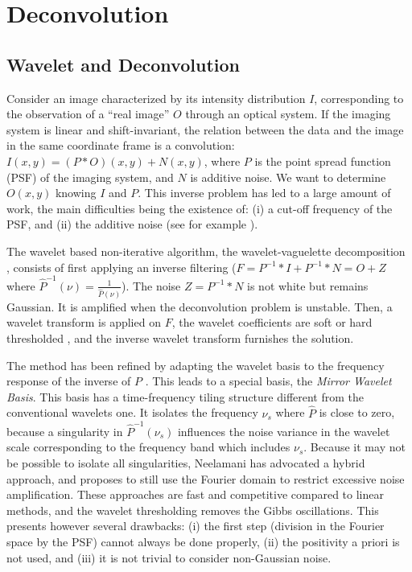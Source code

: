 \chapter{Deconvolution}
\section{Wavelet and Deconvolution}
\label{wdec}
Consider an image characterized by its intensity
distribution $I$, corresponding to the observation of a
``real image'' $O$ through an optical system. If the
imaging system is linear and shift-invariant, the relation between
the data and the image in the same coordinate frame is a
convolution:
$I(x,y) = (P * O)(x,y) + N(x,y)$,
where
$P$ is the point spread function (PSF) of the imaging system, and $N$
is additive noise. We want to determine $O(x,y)$ knowing $I$ and $P$. This
inverse problem has led to a large amount of work, the main difficulties 
being the existence of: (i) a cut-off frequency of the 
PSF, 
and (ii) the additive noise (see for example \cite{ima:bertero98}).

The wavelet based non-iterative algorithm, 
the wavelet-vaguelette decomposition \cite{rest:donoho95b},
consists of first applying an inverse filtering
($F = P^{-1} * I  +  P^{-1} * N = O + Z$
where $\hat{P}^{-1}(\nu) = \frac{1}{\hat{P}(\nu)}$). 
The noise $Z =  P^{-1} * N$ is not white but remains 
Gaussian. It is amplified when the deconvolution
problem is unstable. 
Then, a wavelet transform is applied on $F$, the wavelet coefficients
are soft or hard thresholded \cite{rest:donoho93_2}, 
and the inverse wavelet transform 
furnishes the solution. 

The method has been refined by 
adapting the wavelet basis to the frequency response of the inverse of $P$
\cite{rest:kalifa99}. This leads to a special basis,
the {\em Mirror Wavelet Basis}.  This basis has a 
time-frequency tiling structure different from the conventional wavelets one.
It isolates the frequency $\nu_s$ where $\hat{P}$ is close to zero, because 
a singularity in $\hat{P}^{-1}(\nu_s)$ influences the noise variance in
the wavelet scale corresponding to the frequency band which includes $\nu_s$.
Because it may not be possible to isolate all singularities, Neelamani
\cite{rest:neelamani99} has advocated a hybrid approach,
and proposes to still use the Fourier domain to restrict excessive noise
amplification. These approaches are fast and competitive compared to linear methods, and
the wavelet thresholding removes the Gibbs oscillations. 
This  presents however several drawbacks:
(i) the first step (division in the Fourier space by the PSF) 
cannot always be done properly,
(ii) the positivity a priori is not used, and
(iii) it is not trivial to consider non-Gaussian noise.

